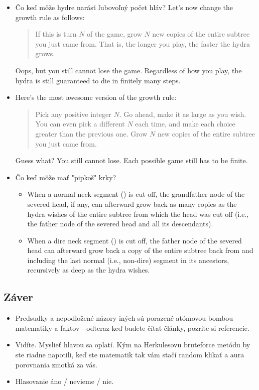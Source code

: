 \documentclass[12pt,a4paper]{article}
\begin{document}
\begin{itemize}
\item Čo keď môže hydre narásť ľubovoľný počet hláv? 
Let's now change the growth rule as follows:
\begin{quote} 
If this is turn $N$ of the game, grow $N$ new copies of the entire subtree you just came from.
That is, the longer you play, the faster the hydra grows.
\end{quote} 
Oops, but you still cannot lose the game. Regardless of how you play, the hydra is still guaranteed to die in finitely many steps.

\item Here's the most awesome version of the growth rule:
\begin{quote} 
Pick any positive integer $N$. Go ahead, make it as large as you wish. You can even pick a different $N$ each time, and make each choice greater than the previous one.
Grow $N$ new copies of the entire subtree you just came from.
\end{quote} 
Guess what? You still cannot lose. Each possible game still has to be finite.

\item Čo keď môže mať "pipkoš" krky?  
  \begin{itemize} 
    \item When a normal neck segment () is cut off, the grandfather node of the severed head, if any, can afterward grow back as many copies as the hydra wishes of the entire subtree from which the head was cut off (i.e., the father node of the severed head and all its descendants).
    \item When a dire neck segment () is cut off, the father node of the severed head can afterward grow back a copy of the entire subtree back from and including the last normal (i.e., non-dire) segment in its ancestors, recursively as deep as the hydra wishes.
  \end{itemize}


\end{itemize} 

\subsection*{Záver} 
\begin{itemize}
\item Predsudky a nepodložené názory iných sú porazené atómovou bombou matematiky a faktov - odteraz keď budete čítať články, pozrite si referencie. 
\item Vidíte. Myslieť hlavou sa oplatí. Kým na Herkulesovu bruteforce metódu by ste riadne napotili, keď ste matematik tak vám stačí random klikať a aura porovnania zmotká za vás. 
\item Hlasovanie áno / nevieme / nie. 
\end{itemize} 
\end{document}
